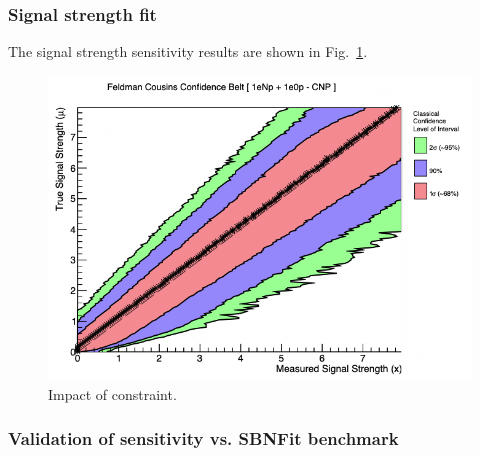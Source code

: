 \newpage
\subsubsection{Signal strength fit}

The signal strength sensitivity results are shown in Fig.~\ref{fig:signalstrengthsensitivity}.
\begin{center}
\begin{figure}[h]
    \includegraphics[width=1.00\textwidth]{technote/SystematicsSensitivity/Figures/signalstrengthsensitivity.png}
    \caption{Impact of constraint.}
    \label{fig:signalstrengthsensitivity} 
\end{figure}
\end{center}

\newpage
\subsubsection{Validation of sensitivity vs. SBNFit benchmark}
